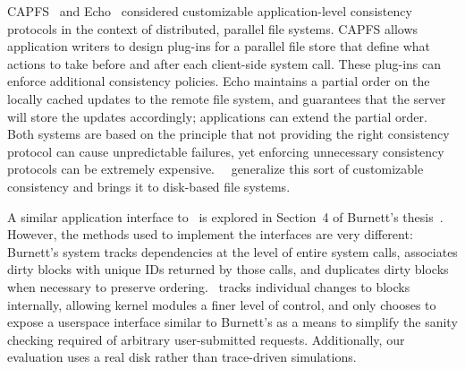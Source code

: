 CAPFS~\cite{vilayannur05providing} and Echo~\cite{mann94coherent}
considered
customizable application-level consistency protocols
in the context of distributed, parallel file systems.
%
CAPFS allows application writers to design plug-ins for a parallel file store
that define what actions to take before and after each client-side system
call.
%
These plug-ins can enforce additional consistency policies.
%
Echo maintains a partial order on the locally cached updates to the remote file
system, and guarantees that the server will store the updates accordingly;
applications can extend the partial order.
%
Both systems are based on the principle that not providing the right
consistency protocol can cause unpredictable failures, yet enforcing
unnecessary consistency protocols can be extremely expensive.
%
%
\Kudos\ \patchgroups\ generalize this sort of customizable consistency
and brings it to disk-based file systems.

A similar application interface to \patchgroups\ is explored in
Section~4 of Burnett's thesis~\cite{burnett06information}. However, the methods
used to implement the interfaces are very different: Burnett's system tracks
dependencies at the level of entire system calls, associates dirty blocks with
unique IDs returned by those calls, and duplicates dirty blocks when necessary
to preserve ordering. \Kudos\ tracks individual changes to blocks internally,
allowing kernel modules a finer level of control, and only chooses to expose a
userspace interface similar to Burnett's as a means to simplify the sanity
checking required of arbitrary user-submitted requests.
%
Additionally, our evaluation uses a real disk rather than trace-driven
simulations.


